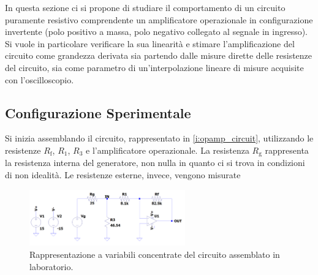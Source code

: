 \documentclass[a4paper,11pt]{article} %
\begin{document}
In questa sezione ci si propone di studiare il comportamento di un circuito puramente resistivo comprendente un
amplificatore operazionale in configurazione invertente (polo positivo a massa, polo negativo collegato al segnale in
ingresso). Si vuole in particolare verificare la sua linearità e stimare l'amplificazione del circuito come grandezza
derivata sia partendo dalle misure dirette delle resistenze del circuito, sia come parametro di un'interpolazione
lineare di misure acquisite con l'oscilloscopio. 



\subsection{Configurazione Sperimentale}\label{s:guadagno}

Si inizia assemblando il circuito, rappresentato in \autoref{i:opamp_circuit}, utilizzando le resistenze $R_{\text{f}}$, $R_1$,
$R_3$ e l'amplificatore operazionale. La resistenza $R_{\text{g}}$ rappresenta la resistenza interna del generatore, non nulla in
quanto ci si trova in condizioni di non idealità. Le resistenze esterne, invece, vengono misurate

\begin{figure}
	\centering
	\includegraphics[width=0.6\textwidth]{../Simulations/OpAmp/circuit_image_nosim.png}
	\caption{\footnotesize Rappresentazione a variabili concentrate del circuito assemblato in laboratorio.}
	\label{i:opamp_circuit}
\end{figure}
\end{document}
